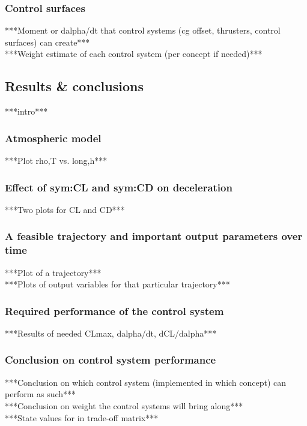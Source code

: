 \subsubsection{Control surfaces}


***Moment or dalpha/dt that control systems (cg offset, thrusters, control surfaces) can create***\\
***Weight estimate of each control system (per concept if needed)***\\

\subsection{Results \& conclusions}
\label{sec:astrores}
***intro***\\

\subsubsection{Atmospheric model}
\label{sec:astroatmos}
***Plot rho,T vs. long,h***\\

\subsubsection{Effect of \gls{sym:CL} and \gls{sym:CD} on deceleration}
\label{sec:astrodec}
***Two plots for CL and CD***\\

\subsubsection{A feasible trajectory and important output parameters over time}
\label{sec:astrorestraj}
***Plot of a trajectory***\\
***Plots of output variables for that particular trajectory***\\

\subsubsection{Required performance of the control system}
\label{sec:astroperfomance}
***Results of needed CLmax, dalpha/dt, dCL/dalpha***\\

\subsubsection{Conclusion on control system performance}
\label{sec:conclusion}
***Conclusion on which control system (implemented in which concept) can perform as such***\\
***Conclusion on weight the control systems will bring along***\\
***State values for in trade-off matrix***\\
